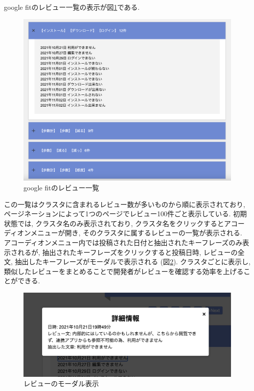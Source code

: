 google fitのレビュー一覧の表示が図\ref{fig:review_items}である. 

\begin{figure}[H]
  \centering
  \includegraphics[scale=0.3]
    {contents/images/review_items.png}
  \caption{google fitのレビュー一覧\label{fig:review_items}}
\end{figure}

\noindent
この一覧はクラスタに含まれるレビュー数が多いものから順に表示されており, ページネーションによって1つのページでレビュー100件ごと表示している. 
初期状態では, クラスタ名のみ表示されており, クラスタ名をクリックするとアコーディオンメニューが開き, そのクラスタに属するレビューの一覧が表示される. アコーディオンメニュー内では投稿された日付と抽出されたキーフレーズのみ表示されるが, 抽出されたキーフレーズをクリックすると投稿日時, レビューの全文, 抽出したキーフレーズがモーダルで表示される (図\ref{fig:modal}). 
クラスタごとに表示し, 類似したレビューをまとめることで開発者がレビューを確認する効率を上げることができる. 

\begin{figure}[H]
  \centering
  \includegraphics[scale=0.5]
    {contents/images/modal.png}
  \caption{レビューのモーダル表示\label{fig:modal}}
\end{figure}

